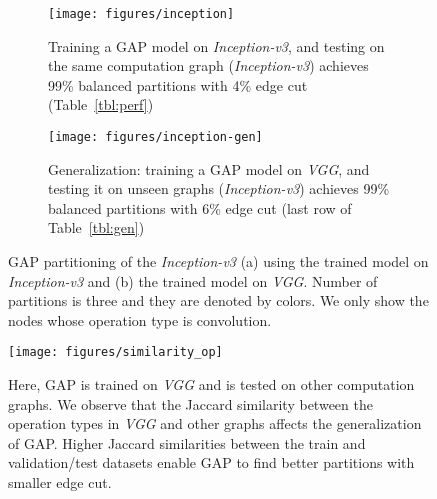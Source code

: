 \documentclass[10pt,twocolumn]{article}
\begin{document}
\begin{figure*}[h]
    \centering
    \begin{subfigure}{0.45\textwidth}
        \texttt{[image: figures/inception]}
        \caption{\small{Training a GAP model on \textit{Inception-v3}, and testing on the same computation graph (\textit{Inception-v3}) achieves 99\% balanced partitions with 4\% edge cut (Table~\ref{tbl:perf})}}
        \label{fig:inception}
    \end{subfigure}
    \hspace{1mm}
    \begin{subfigure}{0.45\textwidth}
        \texttt{[image: figures/inception-gen]}
        \caption{\small{Generalization: training a GAP model on \textit{VGG}, and testing it on unseen graphs (\textit{Inception-v3}) achieves 99\% balanced partitions with 6\% edge cut (last row of Table~\ref{tbl:gen})}}
        \label{fig:inception-gen}
    \end{subfigure}
\caption{GAP partitioning of the \textit{Inception-v3} (a) using the trained model on \textit{Inception-v3} and (b) the trained model on \textit{VGG}. Number of partitions is three and they are denoted by colors. We only show the nodes whose operation type is convolution. }
    \label{fig:inception_gen_vis}
\end{figure*}

\begin{figure}[h]
\centering
\texttt{[image: figures/similarity\_op]}
\caption{Here, GAP is trained on \textit{VGG} and is tested on other computation graphs. We observe that the Jaccard similarity between the operation types in \textit{VGG} and other graphs affects the generalization of GAP. Higher Jaccard similarities between the train and validation/test datasets enable GAP to find better partitions with smaller edge cut.}
\label{fig:similarity_op}
\end{figure}
\end{document}

